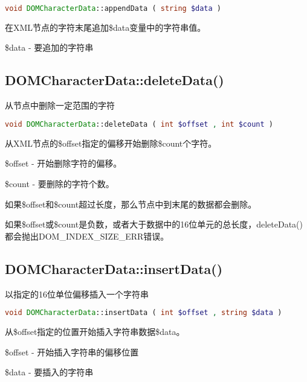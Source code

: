 \begin{lstlisting}[language=PHP]
void DOMCharacterData::appendData ( string $data )
\end{lstlisting}

在XML节点的字符末尾追加\$data变量中的字符串值。

\begin{compactitem}
\item \$data - 要追加的字符串
\end{compactitem}



\subsection{DOMCharacterData::deleteData()}

从节点中删除一定范围的字符

\begin{lstlisting}[language=PHP]
void DOMCharacterData::deleteData ( int $offset , int $count )
\end{lstlisting}

从XML节点的\$offset指定的偏移开始删除\$count个字符。

\begin{compactitem}
\item \$offset - 开始删除字符的偏移。


\item \$count - 要删除的字符个数。
\end{compactitem}

如果\$offset和\$count超过长度，那么节点中到末尾的数据都会删除。

如果\$offset或\$count是负数，或者大于数据中的16位单元的总长度，deleteData()都会抛出DOM\_INDEX\_SIZE\_ERR错误。


\subsection{DOMCharacterData::insertData()}

以指定的16位单位偏移插入一个字符串

\begin{lstlisting}[language=PHP]
void DOMCharacterData::insertData ( int $offset , string $data )
\end{lstlisting}

从\$offset指定的位置开始插入字符串数据\$data。

\begin{compactitem}
\item \$offset - 开始插入字符串的偏移位置
\item \$data - 要插入的字符串
\end{compactitem}

